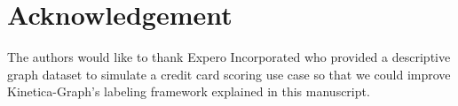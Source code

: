 \documentclass[preprint,3p,twocolumn]{elsarticle}
\def\CircleArrow{\hbox{$\circ$}\kern-1.5pt\hbox{$\rightarrow$}}
\begin{document}









\section*{Acknowledgement}

The authors would like to thank Expero Incorporated who provided a descriptive graph dataset to simulate a credit card scoring use case so that we could improve Kinetica-Graph's labeling framework explained in this manuscript.
\end{document}
